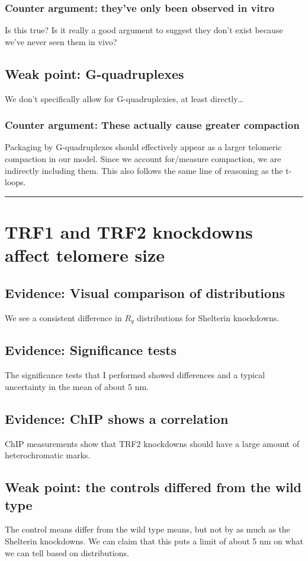 \documentclass[12pt, a4paper]{article}
\begin{document}
\subsubsection{Counter argument: they've only been observed in vitro}
\label{sec-3-3-3}
Is this true? Is it really a good argument to suggest they don't
exist because we've never seen them in vivo?

\subsection{Weak point: G-quadruplexes}
\label{sec-3-4}
We don't specifically allow for G-quadruplexies, at least
directly\ldots{}

\subsubsection{Counter argument: These actually cause greater compaction}
\label{sec-3-4-1}
Packaging by G-quadruplexes should effectively appear as a larger
telomeric compaction in our model. Since we account for/measure
compaction, we are indirectly including them. This also follows
the same line of reasoning as the t-loops.

\rule{\linewidth}{0.5pt}
\section{TRF1 and TRF2 knockdowns affect telomere size}
\label{sec-4}
\subsection{Evidence: Visual comparison of distributions}
\label{sec-4-1}
We see a consistent difference in $R_g$ distributions for Shelterin
knockdowns.
\subsection{Evidence: Significance tests}
\label{sec-4-2}
The significance tests that I performed showed differences and a
typical uncertainty in the mean of about 5 nm.

\subsection{Evidence: ChIP shows a correlation}
\label{sec-4-3}
ChIP measurements show that TRF2 knockdowns should have a large
amount of heterochromatic marks.
\subsection{Weak point: the controls differed from the wild type}
\label{sec-4-4}
The control means differ from the wild type means, but not by as
much as the Shelterin knockdowns. We can claim that this puts a
limit of about 5 nm on what we can tell based on distributions.
\end{document}
